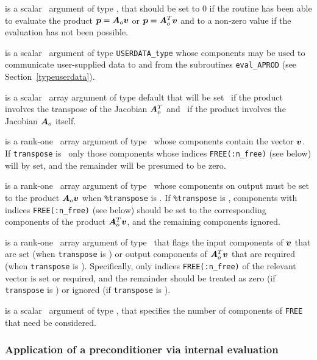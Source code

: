 \documentclass{galahad}
\begin{document}
\begin{description}
 is a scalar \intentout\ argument of type \integer,
that should be set to 0 if the routine has been able to evaluate the
product ${\bm{p}} = {\bm{A}}_o {\bm{v}}$ or ${\bm{p}} = {\bm{A}}_o^T{\bm{v}}$
and to a non-zero value if the evaluation has not been possible.

 is a scalar \intentinout\ argument of type
{\tt USERDATA\_type} whose components may be used
to communicate user-supplied data to and from the subroutines
{\tt eval\_APROD}
(see Section~\ref{typeuserdata}).

 is a scalar \intentin\ array argument of type
default that will be set \true\ if the product involves the transpose
of the Jacobian ${\bm{A}}_o^T$ and \false\ if the product involves
the Jacobian ${\bm{A}}_o$ itself.

 is a rank-one \intentin\ array argument of type \realdp\
whose components contain the vector ${\bm{v}}$. If {\tt transpose} is \false\
only those components whose indices {\tt FREE(:n\_free)} (see below)
will by set, and the remainder will be presumed to be zero.

 is a rank-one \intentout\ array argument of type \realdp\
whose components on output must be set to the
product ${\bm{A}}_o {\bm{v}}$ when {\tt \%transpose} is \false. If
{\tt \%transpose} is \true, components with indices {\tt FREE(:n\_free)}
(see below) should be set to the corresponding components of the
product ${\bm{A}}_o^T {\bm{v}}$, and the remaining components ignored.

\itt{FREE} is a rank-one \intentin\ array argument of
type \integer\ that flags the input components of ${\bm{v}}$ that are set
(when {\tt transpose} is \false) or output components of ${\bm{A}}_o^T {\bm{v}}$ that
are required (when {\tt transpose} is \true). Specifically, only indices
{\tt FREE(:n\_free)} of the relevant vector is set or required, and the
remainder should be treated as zero (if {\tt transpose} is \false)
or ignored  (if {\tt transpose} is \true).

\itt{n\_free} is a scalar \intentin\ argument of type \integer,
that specifies the number of components of {\tt FREE} that need be considered.

\end{description}


\subsubsection{Application of a preconditioner via internal evaluation
\label{prec}}
\end{document}
